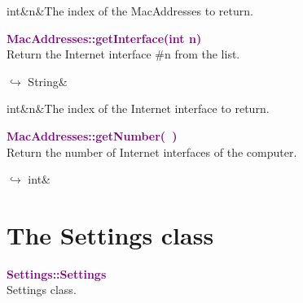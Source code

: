 \begin{tcolorbox}[width=\textwidth,myArgs,tabularx={ll|R}]
int&n&The index of the MacAddresses to return.
\end{tcolorbox}


\textcolor{purple}{\textbf{MacAddresses::getInterface(int n)}}\label{MacAddresses::getInterface(int n)}\\
Return the Internet interface \#n from the list.\vspace*{-0.5em}
\begin{tcolorbox}[grow to left by=-1cm, width=\textwidth-1cm,myArgs,tabularx={l|R}]
$\hookrightarrow$ String&
\end{tcolorbox}

\begin{tcolorbox}[width=\textwidth,myArgs,tabularx={ll|R}]
int&n&The index of the Internet interface to return.
\end{tcolorbox}


\textcolor{purple}{\textbf{MacAddresses::getNumber(~)}}\label{MacAddresses::getNumber()}\\
Return the number of Internet interfaces of the computer.\vspace*{-0.5em}
\begin{tcolorbox}[grow to left by=-1cm, width=\textwidth-1cm,myArgs,tabularx={l|R}]
$\hookrightarrow$ int&
\end{tcolorbox}


\section{The Settings class}

\textcolor{purple}{\textbf{Settings::Settings}}\label{Settings::Settings}\\
Settings class.

